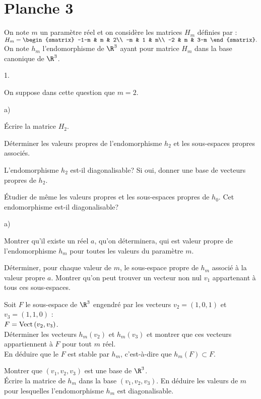 \documentclass[11pt]{article}%
\begin{document}
\newpage


\section*{Planche 3}
\noindent
On note $m$ un paramètre réel et on considère les matrices $H_m$ 
définies
par : $H_m=
\begin{smatrix}
-1-m & m & 2\\
-m & 1 & m\\
-2 & m & 3-m
\end{smatrix}.$\\
On note $h_{m}$ l'endomorphisme de $\R^3$ ayant pour matrice 
$H_m$ dans la base canonique de $\R^3$.

\begin{noliste}{1.}
\item 
On suppose dans cette question que $m=2$.

\begin{noliste}{a)}
\item
Écrire la matrice $H_2$.
\item 
Déterminer les valeurs propres de l'endomorphisme $h_{2}$ et les 
sous-espaces propres associés.

\item 
L'endomorphisme $h_2$ est-il diagonalisable? Si oui, donner une base de 
vecteurs propres de $h_2$.
\end{noliste}

\item 
Étudier de même les valeurs propres et les sous-espaces propres de 
$h_{0}$. Cet endomorphisme est-il diagonalisable?

\item 
\begin{noliste}{a)}
\item 
Montrer qu'il existe un réel $a$, qu'on déterminera, qui est valeur
propre de l'endomorphisme $h_m$ pour toutes les valeurs du paramètre 
$m$.

\item 
Déterminer, pour chaque valeur de $m$, le sous-espace propre de $h_m$ 
associé à
la valeur propre $a$. Montrer qu'on peut trouver un vecteur non nul 
$v_{1}$
appartenant à tous ces sous-espaces.
\end{noliste}

\item 
Soit $F$ le sous-espace de $\R^3$ engendré par les vecteurs 
$v_2=(1,0,1)$ et $v_3=(1,1,0)$ :\\ 
$F={\rm{Vect}}\left(v_2,v_3\right)$.\\
Déterminer les vecteurs $h_m(v_2)$ et $h_m(v_3)$ et montrer que 
ces vecteurs appartiennent à $F$ pour tout $m$ réel.\\
En déduire que le $F$ est stable par $h_m$, c'est-à-dire que 
$h_m(F)\subset F$.

\item 
Montrer que $(v_1,v_2,v_3)$ est une base de $\R^3$.\\
\'Ecrire la matrice de $h_m$ dans la base $(v_1,v_2,v_3)$. En déduire 
les valeurs de $m$ pour lesquelles l'endomorphisme $h_m$ est 
diagonalisable.
\end{noliste}
\end{document}
